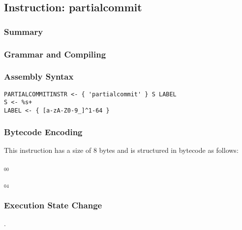 \subsection{Instruction: partialcommit}

\subsubsection{Summary}


\subsubsection{Grammar and Compiling}


\subsubsection{Assembly Syntax}

\begin{myquote}
\begin{verbatim}
PARTIALCOMMITINSTR <- { 'partialcommit' } S LABEL
S <- %s+
LABEL <- { [a-zA-Z0-9_]^1-64 }
\end{verbatim}
\end{myquote}

\subsubsection{Bytecode Encoding}

This instruction has a size of 8 bytes and is structured in bytecode as follows:

$_{00}$\ 



$_{04}$\ 


\subsubsection{Execution State Change}

.


